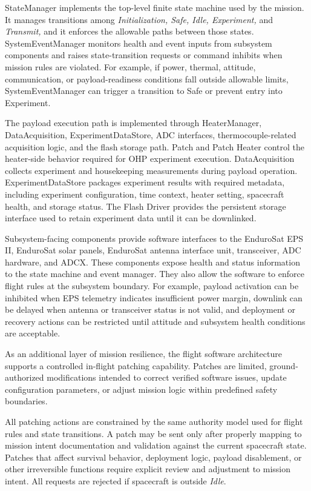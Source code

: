 \documentclass[10pt,letterpaper,twoside,fleqn]{article}
\begin{document}
StateManager implements the top-level finite state machine used by the mission. It manages transitions among \textit{Initialization, Safe, Idle, Experiment,} and \textit{Transmit,} and it enforces the allowable paths between those states. SystemEventManager monitors health and event inputs from subsystem components and raises state-transition requests or command inhibits when mission rules are violated. For example, if power, thermal, attitude, communication, or payload-readiness conditions fall outside allowable limits, SystemEventManager can trigger a transition to Safe or prevent entry into Experiment.

The payload execution path is implemented through HeaterManager, DataAcquisition, ExperimentDataStore, ADC interfaces, thermocouple-related acquisition logic, and the flash storage path. Patch and Patch Heater control the heater-side behavior required for OHP experiment execution. DataAcquisition collects experiment and housekeeping measurements during payload operation. ExperimentDataStore packages experiment results with required metadata, including experiment configuration, time context, heater setting, spacecraft health, and storage status. The Flash Driver provides the persistent storage interface used to retain experiment data until it can be downlinked.

Subsystem-facing components provide software interfaces to the EnduroSat EPS II, EnduroSat solar panels, EnduroSat antenna interface unit, transceiver, ADC hardware, and ADCX. These components expose health and status information to the state machine and event manager. They also allow the software to enforce flight rules at the subsystem boundary. For example, payload activation can be inhibited when EPS telemetry indicates insufficient power margin, downlink can be delayed when antenna or transceiver status is not valid, and deployment or recovery actions can be restricted until attitude and subsystem health conditions are acceptable.

As an additional layer of mission resilience, the flight software architecture supports a controlled in-flight patching capability. Patches are limited, ground-authorized modifications intended to correct verified software issues, update configuration parameters, or adjust mission logic within predefined safety boundaries.

All patching actions are constrained by the same authority model used for flight rules and state transitions. A patch may be sent only after properly mapping to mission intent documentation and validation against the current spacecraft state. Patches that affect survival behavior, deployment logic, payload disablement, or other irreversible functions require explicit review and adjustment to mission intent. All requests are rejected if  spacecraft is outside \textit{Idle}.
\end{document}
